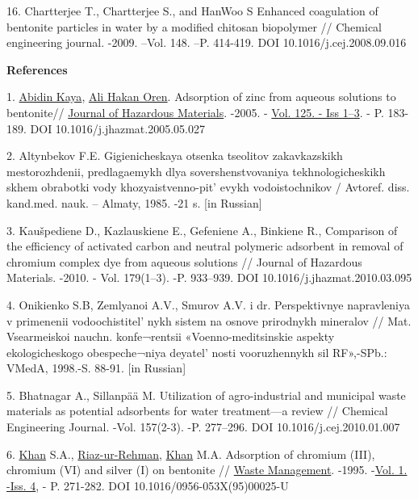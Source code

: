 16. Chartterjee T., Chartterjee S., and HanWoo S Enhanced coagulation of
bentonite particles in water by a modified chitosan biopolymer //
Chemical engineering journal. -2009. --Vol. 148. --P. 414-419. DOI
10.1016/j.cej.2008.09.016

{\bfseries References}

1.
\href{https://www.sciencedirect.com/science/article/abs/pii/S0304389405002669\#!}{Abidin
Kaya},
\href{https://www.sciencedirect.com/science/article/abs/pii/S0304389405002669\#!}{Ali
Hakan Oren}. Adsorption of zinc from aqueous solutions to bentonite//
\href{https://www.sciencedirect.com/science/journal/03043894}{Journal of
Hazardous Materials}. -2005. -
\href{https://www.sciencedirect.com/science/journal/03043894/125/1}{Vol.
125. - Iss 1--3}. - P. 183-189. DOI 10.1016/j.jhazmat.2005.05.027

2. Altynbekov F.E. Gigienicheskaya otsenka tseolitov zakavkazskikh
mestorozhdenii, predlagaemykh dlya sovershenstvovaniya
tekhnologicheskikh skhem obrabotki vody
khozyaistvenno-pit' evykh vodoistochnikov / Avtoref.
diss. kand.med. nauk. -- Almaty, 1985. -21 s. {[}in Russian{]}

3. Kaušpediene D., Kazlauskiene E., Gefeniene A., Binkiene R.,
Comparison of the efficiency of activated carbon and neutral polymeric
adsorbent in removal of chromium complex dye from aqueous solutions //
Journal of Hazardous Materials. -2010. - Vol. 179(1--3). -P. 933--939.
DOI 10.1016/j.jhazmat.2010.03.095

4. Onikienko S.B, Zemlyanoi A.V., Smurov A.V. i dr. Perspektivnye
napravleniya v primenenii vodoochistitel' nykh sistem na
osnove prirodnykh mineralov // Mat. Vsearmeiskoi nauchn. konfe¬rentsii
«Voenno-meditsinskie aspekty ekologicheskogo obespeche¬niya
deyatel' nosti vooruzhennykh sil RF»,-SPb.: VMedA,
1998.-S. 88-91. {[}in Russian{]}

5. Bhatnagar A., Sillanpää M. Utilization of agro-industrial and
municipal waste materials as potential adsorbents for water
treatment---a review // Chemical Engineering Journal. -Vol. 157(2-3).
-P. 277--296. DOI 10.1016/j.cej.2010.01.007

6.
\href{https://www.sciencedirect.com/science/article/pii/0956053X9500025U\#!}{Khan}
S.A.,
\href{https://www.sciencedirect.com/science/article/pii/0956053X9500025U\#!}{Riaz-ur-Rehman},
\href{https://www.sciencedirect.com/science/article/pii/0956053X9500025U\#!}{Khan}
M.A. Adsorption of chromium (III), chromium (VI) and silver (I) on
bentonite //
\href{https://www.sciencedirect.com/science/journal/0956053X}{Waste
Management}. -1995.
-\href{https://www.sciencedirect.com/science/journal/0956053X/15/4}{Vol.
1. -Iss. 4}, - P. 271-282. DOI 10.1016/0956-053X(95)00025-U

